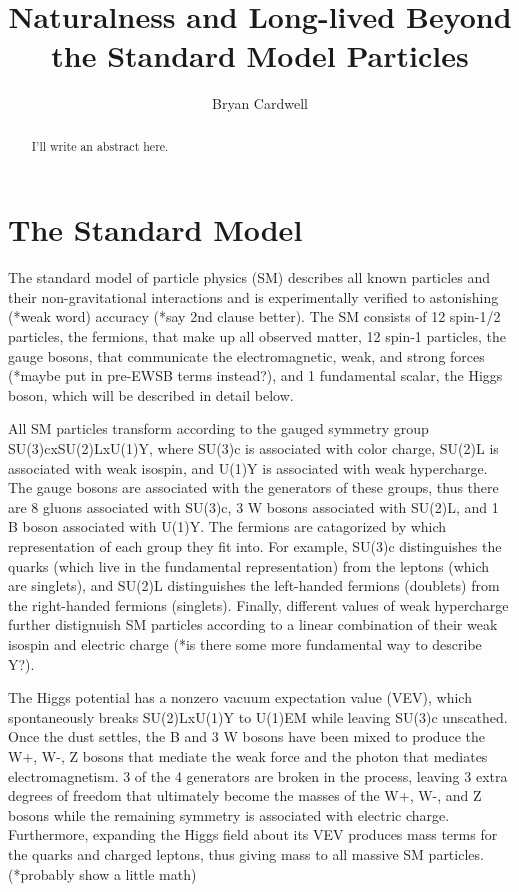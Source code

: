 \documentclass[12pt]{article}
\title{Naturalness and Long-lived Beyond the Standard Model Particles}
\author{Bryan Cardwell}
\begin{document}
\singlespacing

\maketitle

\begin{abstract}

I'll write an abstract here.

\end{abstract}

\newpage
\tableofcontents
\newpage
\doublespacing

\section{The Standard Model}
    The standard model of particle physics (SM) describes all known particles and their non-gravitational interactions and is experimentally verified to astonishing (*weak word) accuracy (*say 2nd clause better). The SM consists of 12 spin-1/2 particles, the fermions, that make up all observed matter, 12 spin-1 particles, the gauge bosons, that communicate the electromagnetic, weak, and strong forces (*maybe put in pre-EWSB terms instead?), and 1 fundamental scalar, the Higgs boson, which will be described in detail below.
    
    All SM particles transform according to the gauged symmetry group SU(3)cxSU(2)LxU(1)Y, where SU(3)c is associated with color charge, SU(2)L is associated with weak isospin, and U(1)Y is associated with weak hypercharge. The gauge bosons are associated with the generators of these groups, thus there are 8 gluons associated with SU(3)c, 3 W bosons associated with SU(2)L, and 1 B boson associated with U(1)Y. The fermions are catagorized by which representation of each group they fit into. For example, SU(3)c distinguishes the quarks (which live in the fundamental representation) from the leptons (which are singlets), and SU(2)L distinguishes the left-handed fermions (doublets) from the right-handed fermions (singlets). Finally, different values of weak hypercharge further distignuish SM particles according to a linear combination of their weak isospin and electric charge (*is there some more fundamental way to describe Y?).

    The Higgs potential has a nonzero vacuum expectation value (VEV), which spontaneously breaks SU(2)LxU(1)Y to U(1)EM while leaving SU(3)c unscathed. Once the dust settles, the B and 3 W bosons have been mixed to produce the W+, W-, Z bosons that mediate the weak force and the photon that mediates electromagnetism. 3 of the 4 generators are broken in the process, leaving 3 extra degrees of freedom that ultimately become the masses of the W+, W-, and Z bosons while the remaining symmetry is associated with electric charge. Furthermore, expanding the Higgs field about its VEV produces mass terms for the quarks and charged leptons, thus giving mass to all massive SM particles. (*probably show a little math)
\end{document}
